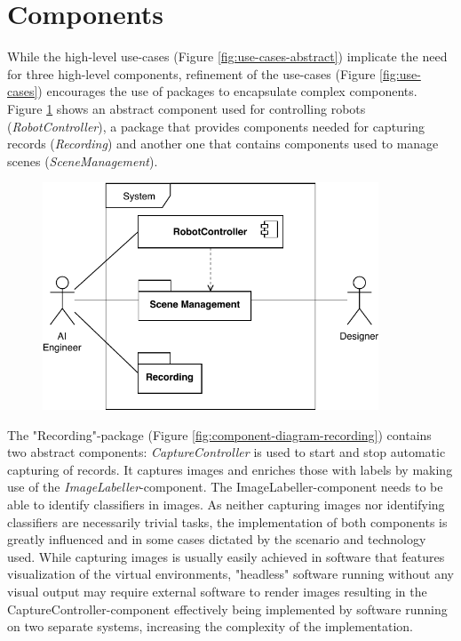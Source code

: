 \section{Components}
While the high-level use-cases (Figure \ref{fig:use-cases-abstract}) implicate the need for three high-level components, refinement of the use-cases (Figure \ref{fig:use-cases}) encourages the use of packages to encapsulate complex components. Figure \ref{fig:component-diagram} shows an abstract component used for controlling robots (\emph{RobotController}), a package that provides components needed for capturing records (\emph{Recording}) and another one that contains components used to manage scenes (\emph{SceneManagement}).
\begin{figure}[hb!]
    \centering
    \includegraphics[width=10cm]{img/ch04/ComponentDiagram_System.pdf}
    \label{fig:component-diagram}
\end{figure}
The "Recording"-package (Figure \ref{fig:component-diagram-recording}) contains two abstract components: \emph{CaptureController} is used to start and stop automatic capturing of records. It captures images and enriches those with labels by making use of the \emph{ImageLabeller}-component. The ImageLabeller-component needs to be able to identify classifiers in images. As neither capturing images nor identifying classifiers are necessarily trivial tasks, the implementation of both components is greatly influenced and in some cases dictated by the scenario and technology used. While capturing images is usually easily achieved in software that features visualization of the virtual environments, "headless" software running without any visual output may require external software to render images resulting in the CaptureController-component effectively being implemented by software running on two separate systems, increasing the complexity of the implementation.
